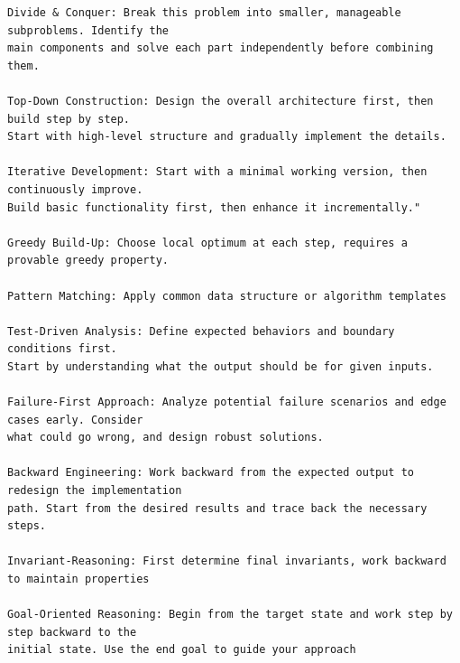 \documentclass{article} %
\theoremstyle{definition}
\theoremstyle{remark}
\begin{document}
\begin{tcolorbox}[notitle, sharp corners, breakable, colframe=Periwinkle, colback=white, 
       boxrule=3pt, boxsep=0.5pt, enhanced, 
       shadow={3pt}{-3pt}{0pt}{opacity=1,mygrey},
       title={Different Thinking Strategy(Mode)},]\label{box:tag-generate}
       \scriptsize
       
\begin{lstlisting}
Divide & Conquer: Break this problem into smaller, manageable subproblems. Identify the 
main components and solve each part independently before combining them.

Top-Down Construction: Design the overall architecture first, then build step by step. 
Start with high-level structure and gradually implement the details.

Iterative Development: Start with a minimal working version, then continuously improve. 
Build basic functionality first, then enhance it incrementally."

Greedy Build-Up: Choose local optimum at each step, requires a provable greedy property.

Pattern Matching: Apply common data structure or algorithm templates

Test-Driven Analysis: Define expected behaviors and boundary conditions first. 
Start by understanding what the output should be for given inputs.

Failure-First Approach: Analyze potential failure scenarios and edge cases early. Consider 
what could go wrong, and design robust solutions.

Backward Engineering: Work backward from the expected output to redesign the implementation 
path. Start from the desired results and trace back the necessary steps.
                       
Invariant-Reasoning: First determine final invariants, work backward to maintain properties

Goal-Oriented Reasoning: Begin from the target state and work step by step backward to the 
initial state. Use the end goal to guide your approach
\end{lstlisting}
\end{tcolorbox}
\end{document}
